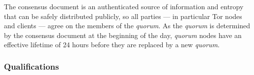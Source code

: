 %
%
%		  
%
%		  
%			
%			
%			
%

The consensus document is an authenticated source of information and entropy that can be safely distributed publicly, so all parties --- in particular Tor nodes and clients --- agree on the members of the \textit{quorum}. As the \textit{quorum} is determined by the consensus document at the beginning of the day, \textit{quorum} nodes have an effective lifetime of 24 hours before they are replaced by a new \textit{quorum}.

\subsubsection{Qualifications}

